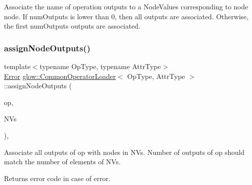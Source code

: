 Associate the name of operation outputs to a Node\+Values corresponding to node {\ttfamily node}. If {\ttfamily num\+Outputs} is lower than 0, then all outputs are associated. Otherwise, the first {\ttfamily num\+Outputs} outputs are associated. \mbox{\label{classglow_1_1_common_operator_loader_a511142e66164d767c6c41766fa79b49b}} 
\subsubsection{\texorpdfstring{assign\+Node\+Outputs()}{assignNodeOutputs()}}
{\footnotesize\ttfamily template$<$typename Op\+Type, typename Attr\+Type$>$ \\
\hyperlink{namespaceglow_afdb176c3a672ef66db0ecfc19a8d39bf}{Error} \hyperlink{classglow_1_1_common_operator_loader}{glow\+::\+Common\+Operator\+Loader}$<$ Op\+Type, Attr\+Type $>$\+::assign\+Node\+Outputs (\begin{DoxyParamCaption}\item[{const Op\+Type \&}]{op,  }\item[{llvm\+::\+Array\+Ref$<$ \hyperlink{structglow_1_1_node_value}{Node\+Value} $>$}]{N\+Vs }\end{DoxyParamCaption})\hspace{0.3cm}{\ttfamily [inline]}, {\ttfamily [protected]}}

Associate all outputs of {\ttfamily op} with nodes in {\ttfamily N\+Vs}. Number of outputs of {\ttfamily op} should match the number of elements of {\ttfamily N\+Vs}. \begin{DoxyReturn}{Returns}
error code in case of error. 
\end{DoxyReturn}
\mbox{\label{classglow_1_1_common_operator_loader_a7bf40c57ba137b70577a1dd307ee2de7}} 

